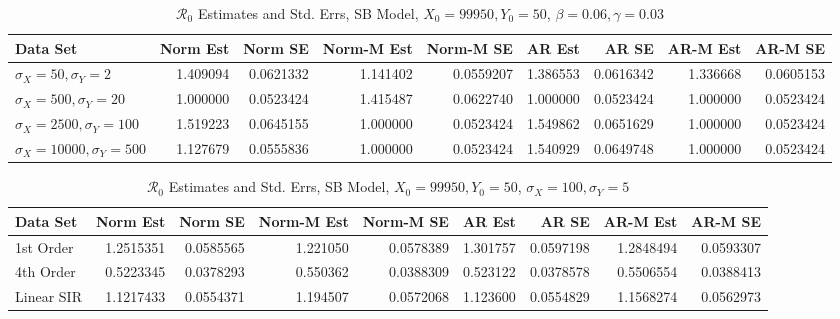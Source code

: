 \documentclass[12pt]{article}
\newcommand{\rr}{\ensuremath{\mathcal{R}_0}}
\begin{document}
\begin{table}[H]
	
	\caption{\label{tab:}$\rr$ Estimates and Std. Errs, SB Model,
		$X_0 = 99950, Y_0 = 50$, $\beta = 0.06, \gamma = 0.03$}
	\centering
	\begin{footnotesize}
	\begin{tabular}[t]{l|r|r|r|r|r|r|r|r}
		\hline
		Data Set & Norm Est & Norm SE & Norm-M Est & Norm-M SE & AR Est & AR SE & AR-M Est & AR-M SE\\
		\hline
		$\sigma_X = 50, \sigma_Y = 2$ & 1.409094 & 0.0621332 & 1.141402 & 0.0559207 & 1.386553 & 0.0616342 & 1.336668 & 0.0605153\\
		\hline
		$\sigma_X = 500, \sigma_Y = 20$ & 1.000000 & 0.0523424 & 1.415487 & 0.0622740 & 1.000000 & 0.0523424 & 1.000000 & 0.0523424\\
		\hline
		$\sigma_X = 2500, \sigma_Y = 100$ & 1.519223 & 0.0645155 & 1.000000 & 0.0523424 & 1.549862 & 0.0651629 & 1.000000 & 0.0523424\\
		\hline
		$\sigma_X = 10000, \sigma_Y = 500$ & 1.127679 & 0.0555836 & 1.000000 & 0.0523424 & 1.540929 & 0.0649748 & 1.000000 & 0.0523424\\
		\hline
	\end{tabular}
\end{footnotesize}
\end{table}

\begin{table}[H]
	
	\caption{\label{tab:}$\rr$ Estimates and Std. Errs, SB Model,
		$X_0 = 99950, Y_0 = 50$, $\sigma_X = 100, \sigma_Y = 5$}
	\centering
	\begin{footnotesize}
	\begin{tabular}[t]{l|r|r|r|r|r|r|r|r}
		\hline
		Data Set & Norm Est & Norm SE & Norm-M Est & Norm-M SE & AR Est & AR SE & AR-M Est & AR-M SE\\
		\hline
		1st Order & 1.2515351 & 0.0585565 & 1.221050 & 0.0578389 & 1.301757 & 0.0597198 & 1.2848494 & 0.0593307\\
		\hline
		4th Order & 0.5223345 & 0.0378293 & 0.550362 & 0.0388309 & 0.523122 & 0.0378578 & 0.5506554 & 0.0388413\\
		\hline
		Linear SIR & 1.1217433 & 0.0554371 & 1.194507 & 0.0572068 & 1.123600 & 0.0554829 & 1.1568274 & 0.0562973\\
		\hline
	\end{tabular}
	\end{footnotesize}
\end{table}
\end{document}
